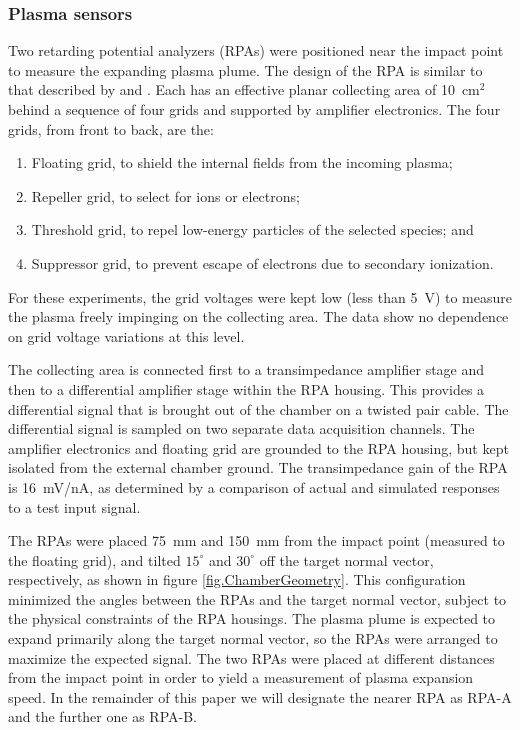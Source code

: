 \subsubsection{Plasma sensors}
Two retarding potential analyzers (RPAs) were positioned near the impact point to measure the expanding plasma plume.  The design of the RPA is similar to that described by \citet{Marrese1997} and \citet{Heelis1998}.  Each has an effective planar collecting area of 10~cm$^2$ behind a sequence of four grids and supported by amplifier electronics.  The four grids, from front to back, are the:
\begin{enumerate}
\item Floating grid, to shield the internal fields from the incoming plasma;
\item Repeller grid, to select for ions or electrons;
\item Threshold grid, to repel low-energy particles of the selected species; and
\item Suppressor grid, to prevent escape of electrons due to secondary ionization.
\end{enumerate}
For these experiments, the grid voltages were kept low (less than 5~V) to measure the plasma freely impinging on the collecting area.  The data show no dependence on grid voltage variations at this level.

The collecting area is connected first to a transimpedance amplifier stage and then to a differential amplifier stage within the RPA housing.  This provides a differential signal that is brought out of the chamber on a twisted pair cable.  The differential signal is sampled on two separate data acquisition channels.  The amplifier electronics and floating grid are grounded to the RPA housing, but kept isolated from the external chamber ground.  The transimpedance gain of the RPA is 16~mV/nA, as determined by a comparison of actual and simulated responses to a test input signal.

The RPAs were placed 75~mm and 150~mm from the impact point (measured to the floating grid), and tilted $15^\circ$ and $30^\circ$ off the target normal vector, respectively, as shown in figure \ref{fig.ChamberGeometry}.  This configuration minimized the angles between the RPAs and the target normal vector, subject to the physical constraints of the RPA housings.  The plasma plume is expected to expand primarily along the target normal vector, so the RPAs were arranged to maximize the expected signal.  The two RPAs were placed at different distances from the impact point in order to yield a measurement of plasma expansion speed.  In the remainder of this paper we will designate the nearer RPA as RPA-A and the further one as RPA-B.

